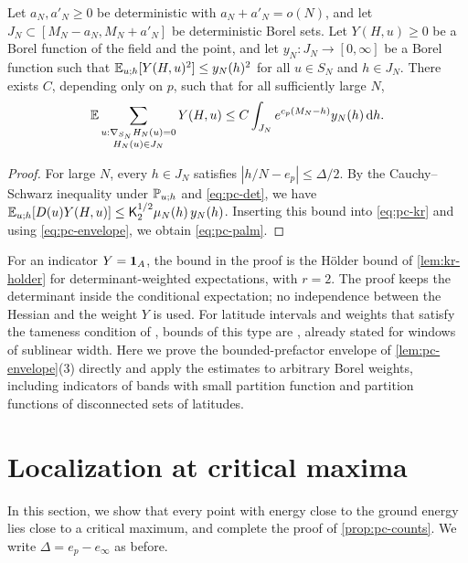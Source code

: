 \begin{lemma}\label{lem:pc-palm}
Let $a_N,a'_N\ge0$ be deterministic with $a_N+a'_N=o(N)$, and let $J_N\subset[M_N-a_N,M_N+a'_N]$ be deterministic Borel sets. Let $Y(H,u)\ge0$ be a Borel function of the field and the point, and let $y_N\colon J_N\to[0,\infty]$ be a Borel function such that $\mathbb E_{u;h}[Y(H,u)^2]\le y_N(h)^2$ for all $u\in S_N$ and $h\in J_N$. There exists $C$, depending only on $p$, such that for all sufficiently large $N$,
\begin{equation}\label{eq:pc-palm}
\mathbb E\sum_{\substack{u:\nabla_{S_N}H_N(u)=0\\H_N(u)\in J_N}}Y(H,u)\le C\int_{J_N}e^{c_p(M_N-h)}y_N(h)\,\mathrm d h.
\end{equation}
\end{lemma}

\begin{proof}
For large $N$, every $h\in J_N$ satisfies $|h/N-e_p|\le\Delta/2$. By the Cauchy--Schwarz inequality under $\mathbb P_{u;h}$ and \eqref{eq:pc-det}, we have $\mathbb E_{u;h}[D(u)Y(H,u)]\le \mathsf K_2^{1/2}\mu_N(h)\,y_N(h)$. Inserting this bound into \eqref{eq:pc-kr} and using \eqref{eq:pc-envelope}, we obtain \eqref{eq:pc-palm}.
\end{proof}

For an indicator $Y=\mathbf 1_A$, the bound in the proof is the H\"older bound of \cref{lem:kr-holder} for determinant-weighted expectations, with $r=2$. The proof keeps the determinant inside the conditional expectation; no independence between the Hessian and the weight $Y$ is used. For latitude intervals and weights that satisfy the tameness condition of \cite[Lemma~36]{Subag2017geometry}, bounds of this type are \cite[Lemmas~38 and~41]{Subag2017geometry}, already stated for windows of sublinear width. Here we prove the bounded-prefactor envelope of \cref{lem:pc-envelope}(3) directly and apply the estimates to arbitrary Borel weights, including indicators of bands with small partition function and partition functions of disconnected sets of latitudes.

\section{Localization at critical maxima}\label{sec:pc-localization}

In this section, we show that every point with energy close to the ground energy lies close to a critical maximum, and complete the proof of \cref{prop:pc-counts}. We write $\Delta=e_p-e_\infty$ as before.

